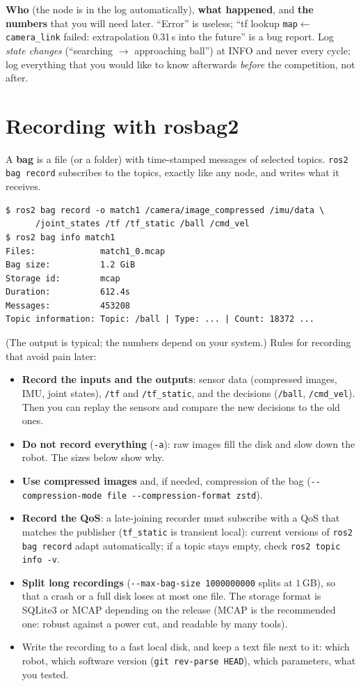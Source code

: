 \begin{keyidea}
\textbf{Who} (the node is in the log automatically), \textbf{what happened}, and \textbf{the numbers} that you will need later. ``Error'' is useless; ``tf lookup \verb!map!$\leftarrow$\verb!camera_link! failed: extrapolation 0.31\,s into the future'' is a bug report. Log \emph{state changes} (``searching $\to$ approaching ball'') at INFO and never every cycle; log everything that you would like to know afterwards \emph{before} the competition, not after.
\end{keyidea}

\section*{Recording with rosbag2}
A \textbf{bag} is a file (or a folder) with time-stamped messages of selected topics. \verb!ros2 bag record! subscribes to the topics, exactly like any node, and writes what it receives.
\begin{verbatim}
$ ros2 bag record -o match1 /camera/image_compressed /imu/data \
      /joint_states /tf /tf_static /ball /cmd_vel
$ ros2 bag info match1
Files:             match1_0.mcap
Bag size:          1.2 GiB
Storage id:        mcap
Duration:          612.4s
Messages:          453208
Topic information: Topic: /ball | Type: ... | Count: 18372 ...
\end{verbatim}
(The output is typical; the numbers depend on your system.) Rules for recording that avoid pain later:
\begin{itemize}[nosep]
\item \textbf{Record the inputs and the outputs}: sensor data (compressed images, IMU, joint states), \verb!/tf! and \verb!/tf_static!, and the decisions (\verb!/ball!, \verb!/cmd_vel!). Then you can replay the sensors and compare the new decisions to the old ones.
\item \textbf{Do not record everything} (\verb!-a!): raw images fill the disk and slow down the robot. The sizes below show why.
\item \textbf{Use compressed images} and, if needed, compression of the bag (\verb!--compression-mode file --compression-format zstd!).
\item \textbf{Record the QoS}: a late-joining recorder must subscribe with a QoS that matches the publisher (\verb!tf_static! is transient local): current versions of \verb!ros2 bag record! adapt automatically; if a topic stays empty, check \verb!ros2 topic info -v!.
\item \textbf{Split long recordings} (\verb!--max-bag-size 1000000000! splits at $1$\,GB), so that a crash or a full disk loses at most one file. The storage format is SQLite3 or MCAP depending on the release (MCAP is the recommended one: robust against a power cut, and readable by many tools).
\item Write the recording to a fast local disk, and keep a text file next to it: which robot, which software version (\verb!git rev-parse HEAD!), which parameters, what you tested.
\end{itemize}

